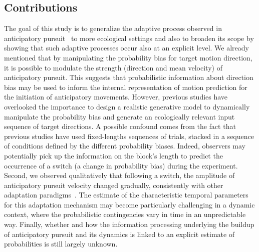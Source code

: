 \documentclass[10pt,letterpaper]{article}
\newcommand{\citep}[1]{\cite{#1}}
\begin{document}
\subsection{Contributions}%
The goal of this study is to generalize the adaptive process
observed in anticipatory pursuit~\citep{Montagnini2010,SantosKowler2017}
to more ecological settings and
also to broaden its scope by showing that such adaptive processes
occur also at an explicit level.
We already mentioned that by manipulating the probability bias for target motion direction,
it is possible to modulate the strength (direction and mean velocity) of anticipatory pursuit.
This suggests that probabilistic information about direction bias may be used
to inform the internal representation of motion prediction
for the initiation of anticipatory movements.
However, %
previous studies have overlooked the importance to design a realistic generative model to dynamically manipulate the probability bias
and generate an ecologically relevant input sequence of target directions.
A possible confound comes from the fact that
previous studies have used fixed-lengths sequences of trials, %
stacked in a sequence of conditions defined by the different probability biases.
Indeed, observers may potentially pick up
the information on the block's length
to predict the occurrence of a switch (a change in probability bias) during the experiment.
Second, we observed qualitatively that following a switch,
the amplitude of anticipatory pursuit velocity changed gradually,
consistently with other adaptation paradigms~\citep{Fukushima1996,Kahlon1996,Souto13}.
The estimate of the characteristic temporal parameters for this adaptation mechanism
may become particularly challenging in a dynamic context,
where the probabilistic contingencies vary in time in an unpredictable way.
Finally, whether and how the information processing underlying
the buildup of anticipatory pursuit and its dynamics is linked to
an explicit estimate of probabilities is still largely unknown.
\end{document}
